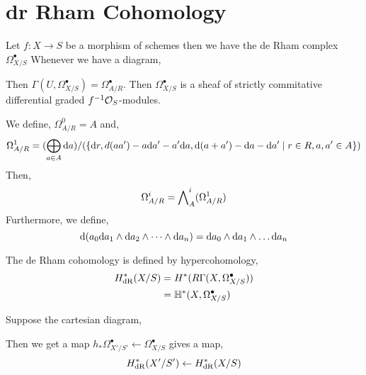 \documentclass[12pt]{article}
\begin{document}
\section{dr Rham Cohomology}

\begin{definition}
Let $f : X \to S$ be a morphism of schemes then we have the de Rham complex $\Omega^\bullet_{X / S}$ 
Whenever we have a diagram,
\begin{center}
\end{center}
Then $\Gamma(U, \Omega^\bullet_{X / S}) = \Omega^\bullet_{A / R}$. Then $\Omega^\bullet_{X / S}$ is a sheaf of strictly commitative differential graded $f^{-1} \mathcal{O}_{S}$-modules.
\end{definition}

\begin{definition}
We define, $\Omega^0_{A / R} = A$ 
and,
\[ \Omega^1_{A / R} = (\bigoplus_{a \in A} \mathrm{d} a)/(\{ \mathrm{d} r, d{(aa')} - a \mathrm{d} a' - a' \mathrm{d} a, \mathrm{d} (a + a') - \mathrm{d} a - \mathrm{d} a' \mid r \in R, a, a' \in A \} ) \]
Then,
\[ \Omega^i_{A / R} = \bigwedge\nolimits^i_A (\Omega_{A / R}^1) \]
Furthermore, we define,
\[ \mathrm{d} ( a_0 \mathrm{d} a_1 \wedge \mathrm{d} a_2 \wedge \dots \wedge \mathrm{d} a_n) = \mathrm{d} a_0 \wedge \mathrm{d} a_1 \wedge \dots \mathrm{d} a_n \]
\end{definition}

\begin{definition}
The de Rham cohomology is defined by hypercohomology,
\begin{align*}
H^*_{\mathrm{dR}}(X / S) & = H^*(R \Gamma(X, \Omega^\bullet_{X / S})) 
\\
& = \mathbb{H}^*(X, \Omega^\bullet_{X / S})
\end{align*}
\end{definition}

\begin{proposition}
Suppose the cartesian diagram,
\begin{center}
\end{center}
Then we get a map $h_* \Omega^\bullet_{X'/S'} \leftarrow \Omega^\bullet_{X / S}$ gives a map,
\[ H_{\mathrm{dR}}^*(X' / S') \leftarrow H^*_{\mathrm{dR}}(X / S) \]
\end{proposition}
\end{document}
